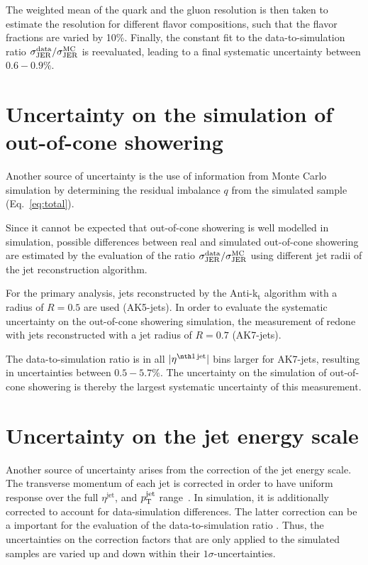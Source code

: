 The weighted mean of the quark and the gluon resolution is then taken to estimate the resolution for different flavor compositions, such that the flavor fractions are varied by 10\%.
Finally, the constant fit to the data-to-simulation ratio $\sigma_\mathrm{JER}^{\text{data}}/\sigma_\mathrm{JER}^{\text{MC}}$ is reevaluated, leading to a final systematic uncertainty between $0.6-0.9\%$.

\section*{Uncertainty on the simulation of out-of-cone showering}
Another source of uncertainty is the use of information from Monte Carlo simulation by determining the residual imbalance $q$ from the simulated \GAMJET sample (Eq.~\eqref{eq:total}).

Since it cannot be expected that out-of-cone showering is well modelled in simulation, possible differences between real and simulated out-of-cone showering are estimated by the evaluation of the ratio $\sigma_\mathrm{JER}^{\text{data}}/\sigma_\mathrm{JER}^{\text{MC}}$ using different jet radii of the jet reconstruction algorithm. 

For the primary analysis, jets reconstructed by the Anti-k$_{\text{t}}$ algorithm with a radius of $R=0.5$ are used (AK5-jets). 
In order to evaluate the systematic uncertainty on the out-of-cone showering simulation, the measurement of \rhores redone with jets reconstructed with a jet radius of $R=0.7$ (AK7-jets). 

The data-to-simulation ratio is in all $|\etafirstjet|$ bins larger for AK7-jets, resulting in uncertainties between $0.5-5.7\%$.
The uncertainty on the simulation of out-of-cone showering is thereby the largest systematic uncertainty of this measurement.



\section*{Uncertainty on the jet energy scale}
Another source of uncertainty arises from the correction of the jet energy scale.
The transverse momentum of each jet is corrected in order to have uniform response over the full $\eta^{\text{jet}}$, and $p_{\text{T}}^{\text{jet}}$ range~\cite{bib:CMS:JME_PAS}.
In simulation, it is additionally corrected to account for data-simulation differences.
The latter correction can be a important for the evaluation of the data-to-simulation ratio \rhores.
Thus, the uncertainties on the correction factors that are only applied to the simulated samples are varied up and down within their $1\sigma$-uncertainties.

